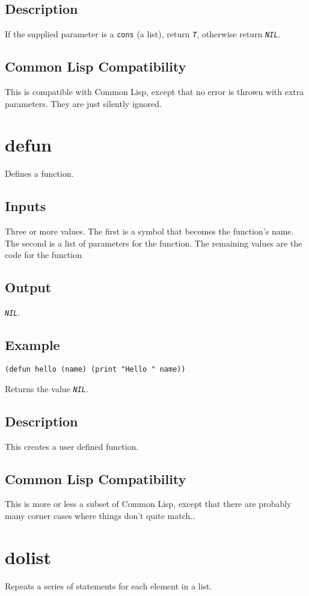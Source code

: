 \documentclass[10pt, openany]{book}
\newcommand{\constant}[1]{\emph{\texttt{#1}}}
\newcommand{\datatype}[1]{\texttt{#1}}
\newcommand{\cl}{Common Lisp}
\begin{document}
\subsection{Description}
If the supplied parameter is a \datatype{cons} (a list), return \constant{T}, otherwise return \constant{NIL}.
\subsection{Common Lisp Compatibility}
This is compatible with \cl, except that no error is thrown with extra parameters.  They are just silently ignored.

\section{defun}
Defines a function.
\subsection{Inputs}
Three or more values.  The first is a symbol that becomes the function's name.  The second is a list of parameters for the function.  The remaining values are the code for the function
\subsection{Output}
\constant{NIL}.
\subsection{Example}
\begin{lstlisting}
(defun hello (name) (print "Hello " name))
\end{lstlisting}
Returns the value \constant{NIL}.
\subsection{Description}
This creates a user defined function.
\subsection{Common Lisp Compatibility}
This is more or less a subset of \cl, except that there are probably many corner cases where things don't quite match..

\section{dolist}
Repeats a series of statements for each element in a list.
\end{document}
